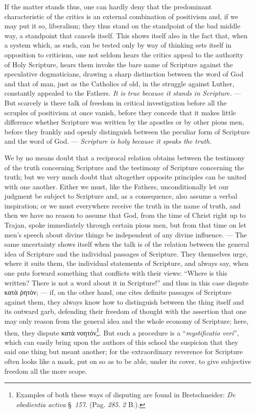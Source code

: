 \documentclass[12pt]{book}
\newcommand{\opage}[1]{\marginnote{\footnotesize\textit{[#1]}}}
\begin{document}
If the matter stands thus, one can hardly deny that the predominant
characteristic of the critics is an external combination of positivism and,
if we may put it so, liberalism; they thus stand on the standpoint of the bad
middle way, a standpoint that cancels itself. This shows itself also in the
fact that, when a system which, as such, can be tested only by way of
thinking sets itself in opposition to criticism, one not seldom hears the
critics appeal to the authority of Holy Scripture, hears them invoke the bare
name of Scripture against the speculative dogmaticians, drawing a sharp
distinction between the word of God and that of man, just as the Catholics
of old, in the struggle against Luther, constantly appealed to the Fathers.
\emph{It is true because it stands in Scripture.} --- But scarcely is there
talk of freedom in critical investigation before all the scruples of
positivism at once vanish, before they concede that it makes little
difference whether Scripture was written by the apostles or by other pious
men, before they frankly and openly distinguish between the peculiar form of
Scripture and the word of God. --- \emph{Scripture is holy because it speaks
the truth.}

We by no means doubt that a reciprocal relation obtains between the testimony
of the truth concerning Scripture and the testimony of Scripture concerning
the truth; but we very much doubt that altogether opposite principles can be
united with one another. Either we must, like the Fathers, unconditionally
let our judgment be subject to Scripture and, as a consequence, also assume
a verbal inspiration; or we must everywhere receive the truth in the name of
truth, and then we have no reason to assume that God, from the time of Christ
right up to Trajan, spoke
\opage{119} \setcounter{footnote}{0}%
immediately through certain pious men, but from that time on let men's speech
about divine things be independent of any divine influence. --- The same
uncertainty shows itself when the talk is of the relation between the general
idea of Scripture and the individual passages of Scripture. They themselves
urge, where it suits them, the individual statements of Scripture, and always
say, when one puts forward something that conflicts with their views: ``Where
is this written? There is not a word about it in Scripture!'' and thus in this
case dispute κατὰ ῥητόν; --- if, on the other hand, one cites definite
passages of Scripture against them, they always know how to distinguish
between the thing itself and its outward garb, defending their freedom of
thought with the assertion that one may only reason from the general idea and
the whole economy of Scripture; here, then, they dispute κατὰ
νοητόν\footnote{Examples of both these ways of disputing are found in
Bretschneider: \textit{De obedientia activa} §~\textit{157}. (Pag.
\textit{285}. \textit{2} B.).}. But such a procedure is a
``\textit{mystificatio veri}'', which can easily bring upon the authors of
this school the suspicion that they said one thing but meant another; for the
extraordinary reverence for Scripture often looks like a mask, put on so as to
be able, under its cover, to give subjective freedom all the more scope.
\end{document}
